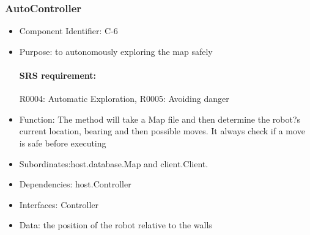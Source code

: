 \documentclass[11pt, a4paper]{report}
\begin{document}
\subsubsection{AutoController}
\begin{itemize}
\item Component Identifier: C-6
\item Purpose: to autonomously exploring the map safely
\paragraph{SRS requirement:} R0004: Automatic Exploration, R0005: Avoiding danger
\item Function: The method will take a Map file and then determine the robot?s current location, bearing and then possible moves. 
It always check if a move is safe before  executing 
\item Subordinates:host.database.Map and client.Client.
\item Dependencies: host.Controller
\item Interfaces: Controller
\item Data: the position of the robot relative to the walls
\end{itemize}
\end{document}
